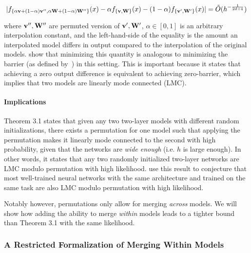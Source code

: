 \begin{equation}
    |f_{\{\alpha{\mathbf{v}} + (1-\alpha){\mathbf{v''}}, \alpha{\mathbf{W}}+(1-\alpha){\mathbf{W''}}\}}(x) - \alpha f_{\{{\mathbf{v}},{\mathbf{W}}\}}(x) - (1-\alpha)f_{\{{\mathbf{v'}},{\mathbf{W'}}\}}(x)| = \Tilde{O}(h^{-\frac{1}{2d+4}})\label{eq:perm_LMC}
\end{equation}

where ${\mathbf{v''}},{\mathbf{W''}}$ are permuted version of ${\mathbf{v'}},{\mathbf{W'}}$, $\alpha\in[0,1]$ is an arbitrary interpolation constant, and the left-hand-side of the equality is the amount an interpolated model differs in output compared to the interpolation of the original models. \citep{entezari2021role} show that minimizing this quantity is analogous to minimizing the barrier (as defined by~\citet{entezari2021role}) in this setting. 
This is important because it states that achieving a zero output difference is equivalent to achieving zero-barrier, which implies that two models are linearly mode connected (LMC). 

\paragraph{Implications} Theorem 3.1 states that given any two two-layer models with different random initializations, there exists a permutation for one model such that applying the permutation makes it linearly mode connected to the second with high probability, given that the networks are \textit{wide enough} (i.e. $h$ is large enough). In other words, it states that any two randomly initialized two-layer networks are LMC modulo permutation with high likelihood. \citet{entezari2021role} use this result to conjecture that most well-trained neural networks with the same architecture and trained on the same task are also LMC modulo permutation with high likelihood. 

Notably however, permutations only allow for merging \textit{across} models. We will show how adding the ability to merge \textit{within} models leads to a tighter bound than Theorem 3.1 with the same likelihood.%


\subsubsection{A Restricted Formalization of Merging Within Models}\label{ap:reducible_def}
